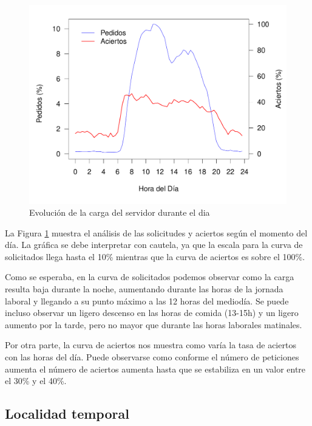 \documentclass[twocolumn]{Jornadas}
\begin{document}
\begin{figure}[tbp]
\begin{center}
  \includegraphics[scale=0.30]{figures/TimeOfDay3_full.pdf}
\end{center}
\caption{Evolución de la carga del servidor durante el dia} \label{Timeday}
\end{figure}

La Figura \ref{Timeday} muestra el análisis de las solicitudes y aciertos según el momento del día. La gráfica se debe interpretar con cautela, ya que la escala para la curva de solicitados llega hasta el 10\% mientras que la curva de aciertos es sobre el 100\%. 

Como se esperaba, en la curva de solicitados podemos observar como la carga resulta baja durante la noche, aumentando durante las horas de la jornada laboral y llegando a su punto máximo a las 12 horas del mediodía. Se puede incluso observar un ligero descenso en las horas de comida (13-15h) y un ligero aumento por la tarde, pero no mayor que durante las horas laborales matinales.

Por otra parte, la curva de aciertos nos muestra como varía la tasa de aciertos con las horas del día. Puede observarse como conforme el número de peticiones aumenta el número de aciertos aumenta hasta que se estabiliza en un valor entre el 30\% y el 40\%.

\subsection{Localidad temporal}
\end{document}
